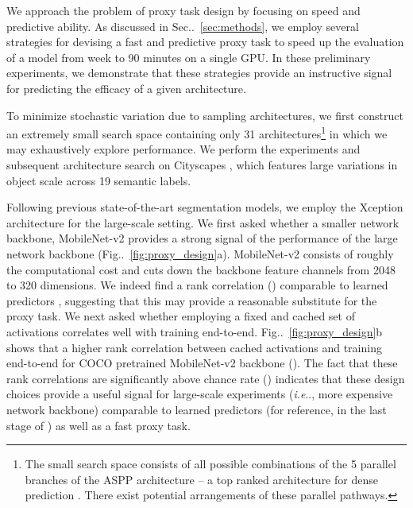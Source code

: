 \documentclass{article}
\makeatletter
\def\@onedot{\ifx\@let@token.\else.\null\fi\xspace}
\DeclareRobustCommand\onedot{\futurelet\@let@token\@onedot}
\newcommand{\figref}[1]{Fig\onedot~\ref{#1}}
\newcommand{\secref}[1]{Sec\onedot~\ref{#1}}
\def\ie{\emph{i.e}\onedot} \def\Ie{\emph{I.e}\onedot}
\makeatother
\begin{document}
We approach the problem of proxy task design by focusing on speed and predictive ability. As discussed in \secref{sec:methods}, we employ several strategies for devising a fast and predictive proxy task to speed up the evaluation of a model from  week to 90 minutes on a single GPU. In these preliminary experiments, we demonstrate that these strategies provide an instructive signal for predicting the efficacy of a given architecture.

To minimize stochastic variation due to sampling architectures, we first construct an extremely small search space containing only 31 architectures\footnote{The small search space consists of all possible combinations of the 5 parallel branches of the ASPP architecture -- a top ranked architecture for dense prediction \cite{chen2017rethinking}. There exist  potential arrangements of these parallel pathways.} in which we may exhaustively explore performance. We perform the experiments and subsequent architecture search on Cityscapes \cite{Cordts2016Cityscapes}, which features large variations in object scale across 19 semantic labels.
















Following previous state-of-the-art segmentation models, we employ the Xception architecture \cite{chollet2016xception, dai2017coco, deeplabv3plus2018} for the large-scale setting. We first asked whether a smaller network backbone, MobileNet-v2 \cite{mobilenetv22018} provides a strong signal of the performance of the large network backbone (\figref{fig:proxy_design}a). 
MobileNet-v2 consists of roughly  the computational cost and cuts down the backbone feature channels from 2048 to 320 dimensions. We indeed find a rank correlation () comparable to learned predictors \cite{liu2018progressive}, suggesting that this may provide a reasonable substitute for the proxy task. We next asked whether employing a fixed and cached set of activations correlates well with training end-to-end.  \figref{fig:proxy_design}b shows that a higher rank correlation between cached activations and training end-to-end for COCO pretrained MobileNet-v2 backbone (). The fact that these rank correlations are significantly above chance rate () indicates that these design choices provide a useful signal for large-scale experiments (\ie, more expensive network backbone) comparable to learned predictors \cite{liu2018progressive, zoph2017learning} (for reference,  in the last stage of \cite{liu2018progressive}) as well as a fast proxy task.
\end{document}
